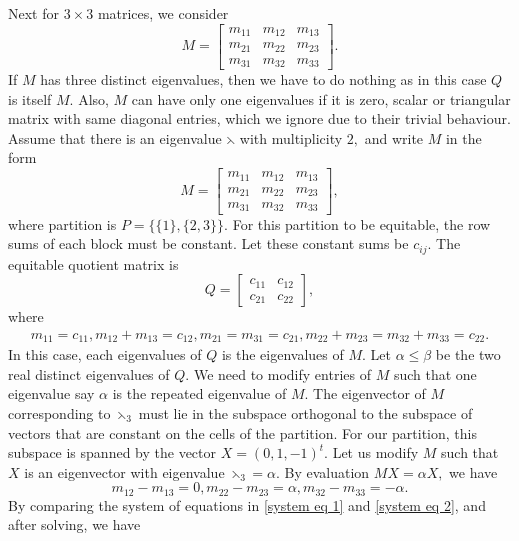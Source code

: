 \documentclass[12pt,twoside]{article}
\begin{document}
Next for $3\times 3$ matrices, we consider 
$$M= \left[ \begin{array}{ccc} m_{11} & m_{12} & m_{13} \\  m_{21} & m_{22} & m_{23} \\ m_{31} & m_{32} & m_{33} \end{array} \right]. $$
If $M$ has three distinct eigenvalues, then we have to do nothing as in this case $Q$ is itself $M$. Also, $M$ can have only one eigenvalues if it is zero, scalar or triangular matrix with same diagonal entries, which we ignore due to their trivial behaviour. Assume that there is an eigenvalue $\leftthreetimes$ with multiplicity $2,$ and write $M$ in the form  
$$ M= \left[ \begin{array}{c|cc} m_{11} & m_{12} & m_{13} \\ \hline m_{21} & m_{22} & m_{23} \\ m_{31} & m_{32} & m_{33} \end{array} \right],$$
where partition is $P=\{\{1\},\{2,3\}\}.$ For this partition to be equitable, the row sums of each block must be constant. Let these constant sums be $c_{ij}$. The equitable quotient matrix is \begin{equation}\label{qmatt}
	Q = \begin{bmatrix} c_{11} & c_{12} \\ c_{21} & c_{22} \end{bmatrix},
\end{equation}
where \begin{align}\label{system eq 1}
 m_{11} = c_{11}, m_{12} + m_{13} = c_{12}, m_{21} = m_{31} = c_{21}, m_{22} + m_{23} = m_{32} + m_{33} = c_{22}.
\end{align}
In this case, each eigenvalues of $Q$ is the eigenvalues of $M$. Let $\alpha\leq \beta$ be the two real distinct eigenvalues of $Q.$ We need to modify entries of $M$ such that one eigenvalue say $\alpha$ is the repeated eigenvalue of $M.$ The eigenvector of $M$ corresponding to $\leftthreetimes_3$ must lie in the subspace orthogonal to the subspace of vectors that are constant on the cells of the partition. For our partition, this subspace is spanned by the vector $X= (0, 1, -1)^t$. Let us modify $M$ such that $X$ is an eigenvector with eigenvalue $\leftthreetimes_3= \alpha$. By evaluation $MX=\alpha X,$ we have 
\begin{equation}\label{system eq 2}
	m_{12}-m_{13}=0, m_{22}-m_{23}=\alpha, m_{32}-m_{33}=-\alpha.
\end{equation}
By comparing the system of equations in \eqref{system eq 1} and \eqref{system eq 2}, and after solving, we have
\end{document}
